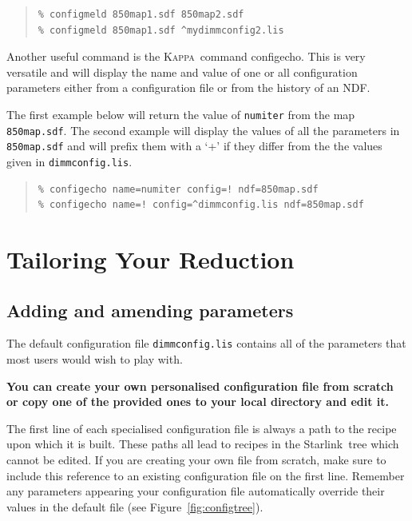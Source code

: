 \documentclass[twoside,11pt]{article}
\newcommand{\htmladdnormallink}[2]{#1}
\newcommand{\htmlref}[2]{#1}
\newcommand{\latexhtml}[2]{#1}
\newcommand{\xref}[3]{#1}
\newcommand{\xlabel}[1]{}
\renewcommand{\_}{\texttt{\symbol{95}}}
\newenvironment{myquote}{
   \color{MidnightBlue}\begin{quote}\begin{small}}{
   \end{small}\end{quote}
}
\newcommand{\starlink}{\htmladdnormallink{Starlink}{http://starlink.jach.hawaii.edu}}
\newcommand{\Kappa}{\xref{\textsc{Kappa}}{sun95}{}}
\newcommand{\task}[1]{\textsf{#1}}
\newcommand{\param}[1]{\texttt{#1}}
\newcommand{\file}[1]{\texttt{#1}}
\newcommand{\configecho}{\xref{\task{configecho}}{sun95}{CONFIGECHO}}
\newcommand{\cref}[3]{\latexhtml{#1~\ref{#2}}{\htmlref{#3}{#2}}}
\renewenvironment{myquote}{
      \begin{quote}\begin{small}}{
      \end{small}\end{quote}
   }
\begin{document}
\begin{myquote}
\begin{verbatim}
% configmeld 850map1.sdf 850map2.sdf
% configmeld 850map1.sdf ^mydimmconfig2.lis
\end{verbatim}
\end{myquote}
Another useful command is the \Kappa\ command \configecho.
This is very versatile and will display the name and value of one or
all configuration parameters either from a configuration file or from
the history of an NDF.

The first example below will return the value of \param{numiter} from
the map \file{850map.sdf}. The second example will display the values of all
the parameters in \file{850map.sdf} and will prefix them with a `+' if they
differ from the the values given in \file{dimmconfig.lis}.

\begin{myquote}
\begin{verbatim}
% configecho name=numiter config=! ndf=850map.sdf
% configecho name=! config=^dimmconfig.lis ndf=850map.sdf
\end{verbatim}
\end{myquote}


\clearpage
\section{\xlabel{tweak}Tailoring Your Reduction}
\label{sec:tweak}


\subsection{Adding and amending parameters}
The default configuration file \file{dimmconfig.lis} contains all of
the parameters that most users would wish to play with.

\textbf{You can create your own personalised configuration file from
scratch or copy one of the provided ones to your local directory and
edit it.}

The first line of each specialised configuration file is always a path
to the recipe upon which it is built. These paths all lead to
recipes in the \starlink\ tree which cannot be edited. If you are
creating your own file from scratch, make sure to include this
reference to an existing configuration file on the first line.
Remember any parameters appearing your configuration file
automatically override their values in the default file (see
\cref{Figure}{fig:configtree}{this figure}).
\end{document}

